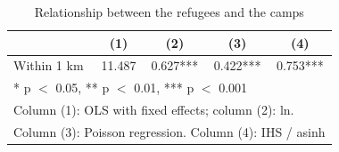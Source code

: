 \begin{table}
\centering
\caption{Relationship between the refugees and the camps}
\centering
\begin{tabular}[t]{lcccc}
\toprule
  & (1) & (2) & (3) & (4)\\
\midrule
Within 1 km & 11.487 & 0.627*** & 0.422*** & 0.753***\\
\bottomrule
\multicolumn{5}{l}{\rule{0pt}{1em}* p $<$ 0.05, ** p $<$ 0.01, *** p $<$ 0.001}\\
\multicolumn{5}{l}{\rule{0pt}{1em}Column (1): OLS with fixed effects; column (2): ln.}\\
\multicolumn{5}{l}{\rule{0pt}{1em}Column (3): Poisson regression. Column (4): IHS / asinh}\\
\end{tabular}
\end{table}
